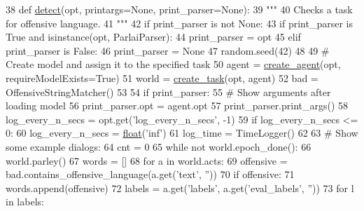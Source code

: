 \begin{DoxyCode}
38 \textcolor{keyword}{def }\hyperlink{namespaceparlai_1_1scripts_1_1detect__offensive__language_aecc66ec4441e506a93d25964889c185f}{detect}(opt, printargs=None, print\_parser=None):
39     \textcolor{stringliteral}{"""}
40 \textcolor{stringliteral}{    Checks a task for offensive language.}
41 \textcolor{stringliteral}{    """}
42     \textcolor{keywordflow}{if} print\_parser \textcolor{keywordflow}{is} \textcolor{keywordflow}{not} \textcolor{keywordtype}{None}:
43         \textcolor{keywordflow}{if} print\_parser \textcolor{keywordflow}{is} \textcolor{keyword}{True} \textcolor{keywordflow}{and} isinstance(opt, ParlaiParser):
44             print\_parser = opt
45         \textcolor{keywordflow}{elif} print\_parser \textcolor{keywordflow}{is} \textcolor{keyword}{False}:
46             print\_parser = \textcolor{keywordtype}{None}
47     random.seed(42)
48 
49     \textcolor{comment}{# Create model and assign it to the specified task}
50     agent = \hyperlink{namespaceparlai_1_1core_1_1agents_ad0d54074d4bcc148bb415ab5515a53b5}{create\_agent}(opt, requireModelExists=\textcolor{keyword}{True})
51     world = \hyperlink{namespaceparlai_1_1core_1_1worlds_a11923c10b545c7ecc1b08fe2242d9c2c}{create\_task}(opt, agent)
52     bad = OffensiveStringMatcher()
53 
54     \textcolor{keywordflow}{if} print\_parser:
55         \textcolor{comment}{# Show arguments after loading model}
56         print\_parser.opt = agent.opt
57         print\_parser.print\_args()
58     log\_every\_n\_secs = opt.get(\textcolor{stringliteral}{'log\_every\_n\_secs'}, -1)
59     \textcolor{keywordflow}{if} log\_every\_n\_secs <= 0:
60         log\_every\_n\_secs = \hyperlink{namespaceprojects_1_1controllable__dialogue_1_1make__control__dataset_aa2b7207688c641dbc094ab44eca27113}{float}(\textcolor{stringliteral}{'inf'})
61     log\_time = TimeLogger()
62 
63     \textcolor{comment}{# Show some example dialogs:}
64     cnt = 0
65     \textcolor{keywordflow}{while} \textcolor{keywordflow}{not} world.epoch\_done():
66         world.parley()
67         words = []
68         \textcolor{keywordflow}{for} a \textcolor{keywordflow}{in} world.acts:
69             offensive = bad.contains\_offensive\_language(a.get(\textcolor{stringliteral}{'text'}, \textcolor{stringliteral}{''}))
70             \textcolor{keywordflow}{if} offensive:
71                 words.append(offensive)
72             labels = a.get(\textcolor{stringliteral}{'labels'}, a.get(\textcolor{stringliteral}{'eval\_labels'}, \textcolor{stringliteral}{''}))
73             \textcolor{keywordflow}{for} l \textcolor{keywordflow}{in} labels:

\end{DoxyCode}

